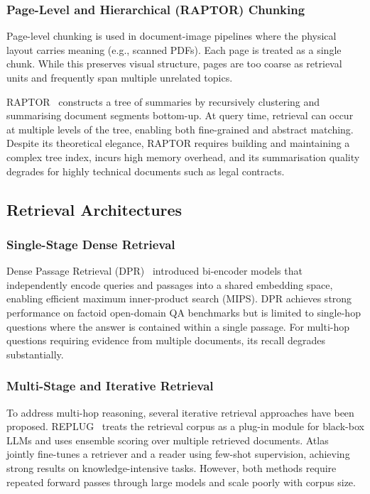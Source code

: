 \documentclass[12pt,a4paper]{article}
\begin{document}
\subsubsection{Page-Level and Hierarchical (RAPTOR) Chunking}

Page-level chunking is used in document-image pipelines where the physical
layout carries meaning (e.g., scanned PDFs). Each page is treated as a
single chunk. While this preserves visual structure, pages are too coarse
as retrieval units and frequently span multiple unrelated topics.

RAPTOR~\cite{sarthi2024raptor} constructs a tree of summaries by recursively
clustering and summarising document segments bottom-up. At query time,
retrieval can occur at multiple levels of the tree, enabling both fine-grained
and abstract matching. Despite its theoretical elegance, RAPTOR requires
building and maintaining a complex tree index, incurs high memory overhead,
and its summarisation quality degrades for highly technical documents such
as legal contracts.

\subsection{Retrieval Architectures}

\subsubsection{Single-Stage Dense Retrieval}

Dense Passage Retrieval (DPR)~\cite{karpukhin2020dpr} introduced bi-encoder
models that independently encode queries and passages into a shared embedding
space, enabling efficient maximum inner-product search (MIPS). DPR achieves
strong performance on factoid open-domain QA benchmarks but is limited to
single-hop questions where the answer is contained within a single passage.
For multi-hop questions requiring evidence from multiple documents, its
recall degrades substantially.

\subsubsection{Multi-Stage and Iterative Retrieval}

To address multi-hop reasoning, several iterative retrieval approaches have
been proposed. REPLUG~\cite{yu2023replug} treats the retrieval corpus as a
plug-in module for black-box LLMs and uses ensemble scoring over multiple
retrieved documents. Atlas~\cite{izacard2022atlas} jointly fine-tunes a
retriever and a reader using few-shot supervision, achieving strong results
on knowledge-intensive tasks. However, both methods require repeated forward
passes through large models and scale poorly with corpus size.
\end{document}
